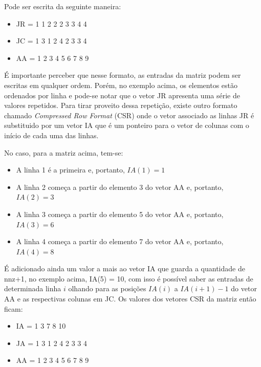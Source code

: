 Pode ser escrita da seguinte maneira:


\begin{center}
    \begin{itemize}
        \item  JR = 1 1 2 2 2 3 3 4 4
        \item  JC = 1 3 1 2 4 2 3 3 4
        \item  AA = 1 2 3 4 5 6 7 8 9
    \end{itemize}
\end{center}


É importante perceber que nesse formato, as entradas da matriz podem ser escritas em qualquer ordem. Porém, no exemplo acima, os elementos estão ordenados por linha e pode-se notar que o vetor JR apresenta uma série de valores repetidos. Para tirar proveito dessa repetição, existe outro formato chamado \textit{Compressed Row Format} (CSR) onde o vetor associado as linhas JR é substituido por um vetor IA que é um ponteiro para o vetor de colunas com o início de cada uma das linhas.

No caso, para a matriz acima, tem-se:

\begin{itemize}
    \item A linha 1 é a primeira e, portanto, $IA(1) = 1$
    \item A linha 2 começa a partir do elemento 3 do vetor AA e, portanto, $IA(2) = 3$
    \item A linha 3 começa a partir do elemento 5 do vetor AA e, portanto, $IA(3) = 6$
    \item A linha 4 começa a partir do elemento 7 do vetor AA e, portanto, $IA(4) = 8$
\end{itemize}

É adicionado ainda um valor a mais ao vetor IA que guarda a quantidade de nnz+1, no exemplo acima, IA(5) = 10, com isso é possível saber as entradas de determinada linha $i$ olhando para as posições $IA(i)$ a $IA(i+1)-1$ do vetor AA e as respectivas colunas em JC. Os valores dos vetores CSR da matriz então ficam:

\begin{center}
    \begin{itemize}
        \item IA = 1 3 7 8 10
        \item JA = 1 3 1 2 4 2 3 3 4
        \item AA = 1 2 3 4 5 6 7 8 9
    \end{itemize}
\end{center}


